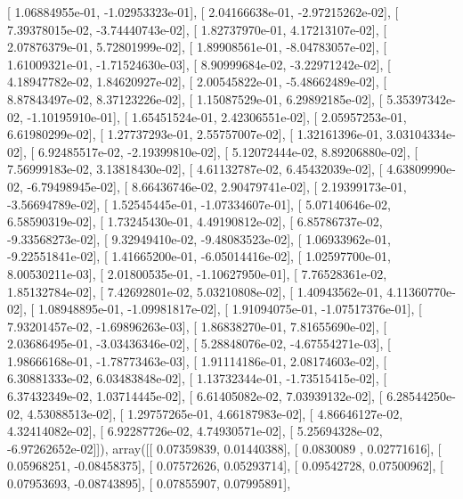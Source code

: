 \documentclass{article}
\begin{document}
       [  1.06884955e-01,  -1.02953323e-01],
       [  2.04166638e-01,  -2.97215262e-02],
       [  7.39378015e-02,  -3.74440743e-02],
       [  1.82737970e-01,   4.17213107e-02],
       [  2.07876379e-01,   5.72801999e-02],
       [  1.89908561e-01,  -8.04783057e-02],
       [  1.61009321e-01,  -1.71524630e-03],
       [  8.90999684e-02,  -3.22971242e-02],
       [  4.18947782e-02,   1.84620927e-02],
       [  2.00545822e-01,  -5.48662489e-02],
       [  8.87843497e-02,   8.37123226e-02],
       [  1.15087529e-01,   6.29892185e-02],
       [  5.35397342e-02,  -1.10195910e-01],
       [  1.65451524e-01,   2.42306551e-02],
       [  2.05957253e-01,   6.61980299e-02],
       [  1.27737293e-01,   2.55757007e-02],
       [  1.32161396e-01,   3.03104334e-02],
       [  6.92485517e-02,  -2.19399810e-02],
       [  5.12072444e-02,   8.89206880e-02],
       [  7.56999183e-02,   3.13818430e-02],
       [  4.61132787e-02,   6.45432039e-02],
       [  4.63809990e-02,  -6.79498945e-02],
       [  8.66436746e-02,   2.90479741e-02],
       [  2.19399173e-01,  -3.56694789e-02],
       [  1.52545445e-01,  -1.07334607e-01],
       [  5.07140646e-02,   6.58590319e-02],
       [  1.73245430e-01,   4.49190812e-02],
       [  6.85786737e-02,  -9.33568273e-02],
       [  9.32949410e-02,  -9.48083523e-02],
       [  1.06933962e-01,  -9.22551841e-02],
       [  1.41665200e-01,  -6.05014416e-02],
       [  1.02597700e-01,   8.00530211e-03],
       [  2.01800535e-01,  -1.10627950e-01],
       [  7.76528361e-02,   1.85132784e-02],
       [  7.42692801e-02,   5.03210808e-02],
       [  1.40943562e-01,   4.11360770e-02],
       [  1.08948895e-01,  -1.09981817e-02],
       [  1.91094075e-01,  -1.07517376e-01],
       [  7.93201457e-02,  -1.69896263e-03],
       [  1.86838270e-01,   7.81655690e-02],
       [  2.03686495e-01,  -3.03436346e-02],
       [  5.28848076e-02,  -4.67554271e-03],
       [  1.98666168e-01,  -1.78773463e-03],
       [  1.91114186e-01,   2.08174603e-02],
       [  6.30881333e-02,   6.03483848e-02],
       [  1.13732344e-01,  -1.73515415e-02],
       [  6.37432349e-02,   1.03714445e-02],
       [  6.61405082e-02,   7.03939132e-02],
       [  6.28544250e-02,   4.53088513e-02],
       [  1.29757265e-01,   4.66187983e-02],
       [  4.86646127e-02,   4.32414082e-02],
       [  6.92287726e-02,   4.74930571e-02],
       [  5.25694328e-02,  -6.97262652e-02]]), array([[ 0.07359839,  0.01440388],
       [ 0.0830089 ,  0.02771616],
       [ 0.05968251, -0.08458375],
       [ 0.07572626,  0.05293714],
       [ 0.09542728,  0.07500962],
       [ 0.07953693, -0.08743895],
       [ 0.07855907,  0.07995891],
\end{document}
